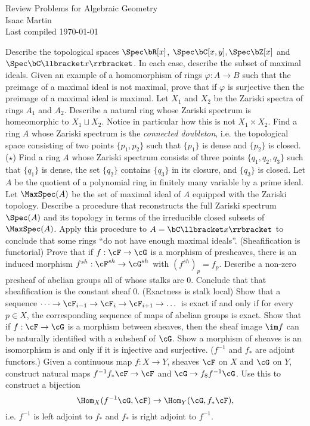 


\pagestyle{empty}
	\LARGE
\begin{center}
	Review Problems for Algebraic Geometry\\
	\Large
	Isaac Martin \\
    Last compiled \today
\end{center}
\normalsize
\vspace{-2mm}
\hru
{}
\begin{homework}[e]
	\prob Describe the topological spaces $\Spec \bR[x]$, $\Spec \bC[x,y], \Spec\bZ[x]$ and $\Spec \bC\llbracket x\rrbracket$. In each case, describe the subset of maximal ideals.
	\prob Given an example of a homomorphism of rings $\varphi: A\to B$ such that the preimage of a maximal ideal is not maximal, prove that if $\varphi$ is surjective then the preimage of a maximal ideal is maximal.
	\prob Let $X_1$ and $X_2$ be the Zariski spectra of rings $A_1$ and $A_2$. Describe a natural ring whose Zariski spectrum is homeomorphic to $X_1 \sqcup X_2$. Notice in particular how this is not $X_1\times X_2$.
	\prob Find a ring $A$ whose Zariski spectrum is the \textit{connected doubleton}, i.e. the topological space consisting of two points $\{p_1,p_2\}$ such that $\{p_1\}$ is dense and $\{p_2\}$ is closed. ($\star$) Find a ring $A$ whose Zariski spectrum consists of three points $\{q_1,q_2,q_3\}$ such that $\{q_1\}$ is dense, the set $\{q_2\}$ contains $\{q_3\}$ in its closure, and $\{q_3\}$ is closed.
	\prob Let $A$ be the quotient of a polynomial ring in finitely many variable by a prime ideal. Let $\MaxSpec(A)$ be the set of maximal ideal of $A$ equipped with the Zariski topology. Describe a procedure that reconstructs the full Zariski spectrum $\Spec(A)$ and its topology in terms of the irreducible closed subsets of $\MaxSpec(A)$. Apply this procedure to $A = \bC\llbracket x \rrbracket$ to conclude that some rings ``do not have enough maximal ideals''.
	\prob (Sheafification is functorial) Prove that if $f:\cF \to \cG$ is a morphism of presheaves, there is an induced morphism $f^{sh}:\cF^{sh}\to \cG^{sh}$ with $(f^{sh})_p = f_p$.
	\prob Describe a non-zero presheaf of abelian groups all of whose stalks are 0. Conclude that that sheafification is the constant sheaf 0.
	\prob (Exactness is stalk local) Show that a sequence $\dots \to \cF_{i-1} \to \cF_{i} \to \cF_{i+1} \to \dots$ is exact if and only if for every $p \in X$, the corresponding sequence of maps of abelian groups is exact.
	\prob Show that if $f:\cF\to \cG$ is a morphism between sheaves, then the sheaf image $\im f$ can be naturally identified with a subsheaf of $\cG$.
	\prob Show a morphism of sheaves is an isomorphism is and only if it is injective and surjective.
	\prob ($f^{-1}$ and $f_*$ are adjoint functors.) Given a continuous map $f:X\to Y$, sheaves $\cF$ on $X$ and $\cG$ on $Y$, construct natural maps $f^{-1}f_*\cF\to \cF$ and $\cG \to f_8f^{-1}\cG$. Use this to construct a bijection
	\[
	\Hom_X(f^{-1}\cG, \cF) \to \Hom_Y(\cG, f_*\cF),
	\]
	i.e. $f^{-1}$ is left adjoint to $f_ *$ and $f_*$ is right adjoint to $f^{-1}$.


\end{homework}
